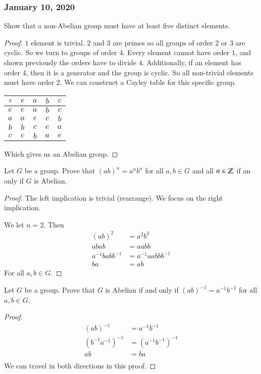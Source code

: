\subsubsection*{January 10, 2020}

\exercise Show that a non-Abelian group must have at least five distinct elements. 
\begin{proof}
$1$ element is trivial. $2$ and $3$ are primes so all groups of order $2$ or $3$ are cyclic. So we turn to groups of order $4$. Every element cannot have order $1$, and shown previously the orders have to divide $4$. Additionally, if an element has order $4$, then it is a generator and the group is cyclic. So all non-trivial elements must have order $2$. We can construct a Cayley table for this specific group. 

\begin{center}
\begin{tabular}{c|cccc}
$\circ$ & $e$ & $a$ & $b$ & $c$ \\ \hline
$e$     & $e$ & $a$ & $b$ & $c$ \\
$a$     & $a$ & $e$ & $c$ & $b$ \\
$b$     & $b$ & $c$ & $e$ & $a$ \\
$c$     & $c$ & $b$ & $a$ & $e$
\end{tabular}	
\end{center}
Which gives us an Abelian group. 
\end{proof}

\exercise Let $G$ be a group. Prove that $(ab)^n=a^nb^n$ for all $a, b\in G$ and all $n\in \mathbb{Z}$ if an only if $G$ is Abelian. 
\begin{proof}
The left implication is trivial (rearrange). We focus on the right implication. 

We let $n=2$. Then
\begin{align*}
(ab)^2 &= a^2b^2\\
abab &= aabb \\
a^{-1}babb^{-1} &= a^{-1}aabbb^{-1} \\
ba &= ab
\end{align*}
For all $a,b\in G$. 
\end{proof}

\exercise Let $G$ be a group. Prove that $G$ is Abelian if and only if $(ab)^{-1}=a^{-1}b^{-1}$ for all $a,b\in G$. 
\begin{proof}
\begin{align*}
	(ab)^{-1}&=a^{-1}b^{-1} \\
	(b^{-1}a^{-1})^{-1} &= (a^{-1}b^{-1})^{-1} \\
	ab &= ba \\
\end{align*}
We can travel in both directions in this proof. 
\end{proof}

